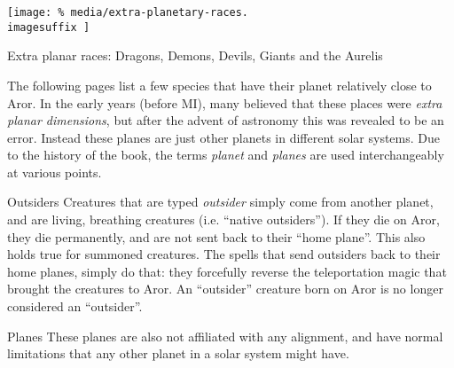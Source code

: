 \ifimages
\begin{figure*}[ht!]
    \centering
    \vspace{-2.6cm}
    \centerline{
      \texttt{[image: \%
        media/extra-planetary-races.\\imagesuffix
      ]}
    }
    \par
    Extra planar races: Dragons, Demons, Devils, Giants and the Aurelis
\end{figure*}
\fi

The following pages list a few species that have their planet relatively close
to Aror. In the early years (before MI), many believed that these places were
\emph{extra planar dimensions}, but after the advent of astronomy this was
revealed to be an error. Instead these planes are just other planets in
different solar systems. Due to the history of the book, the terms
\emph{planet} and \emph{planes} are used interchangeably at various points.

\begin{35e}{Outsiders}
  Creatures that are typed \emph{outsider} simply come from another planet,
  and are living, breathing creatures (i.e. ``native outsiders''). If they die
  on Aror, they die permanently, and are not sent back to their ``home
  plane''. This also holds true for summoned creatures. The spells that send
  outsiders back to their home planes, simply do that: they forcefully reverse
  the teleportation magic that brought the creatures to Aror. An ``outsider''
  creature born on Aror is no longer considered an ``outsider''.
\end{35e}

\begin{35e}{Planes}
  These planes are also not affiliated with any alignment, and have normal
  limitations that any other planet in a solar system might have.
\end{35e}







